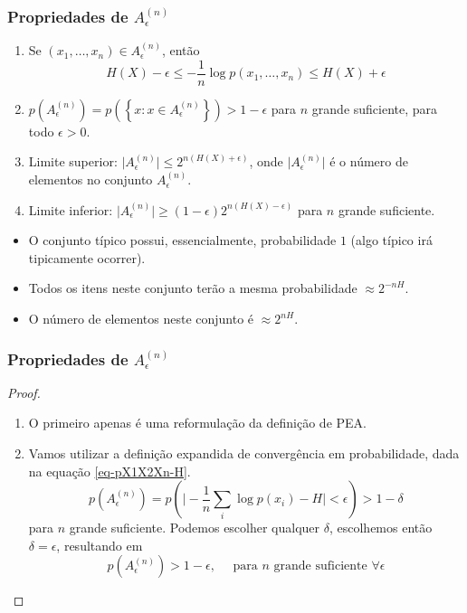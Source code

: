 \begin{frame}%
  \frametitle{Propriedades de $A_\epsilon^{(n)}$}
  \begin{theorem}
  \begin{enumerate}
  \item Se $(x_1, \ldots, x_n) \in A_\epsilon^{(n)}$, então
        \begin{equation}
        H(X) - \epsilon \leq - \frac{1}{n} \log p(x_1, \ldots, x_n) \leq H(X) + \epsilon
        \end{equation}
  \item $p(A_\epsilon^{(n)}) = p\left( \left\{ x: x \in A_\epsilon^{(n)} \right\} \right) > 1 - \epsilon$
        para $n$ grande suficiente, para todo $\epsilon > 0$.
  \item Limite superior: $\vert A_\epsilon^{(n)} \vert \leq 2^{n(H(X)+\epsilon)}$, onde
        $\vert A_\epsilon^{(n)} \vert$ é o número de elementos no conjunto $A_\epsilon^{(n)}$.
  \item Limite inferior: $\vert A_\epsilon^{(n)} \vert \geq (1-\epsilon) 2^{n(H(X)-\epsilon)}$ para
        $n$ grande suficiente.
  \end{enumerate}
  \end{theorem}
  
  \begin{itemize}
  \item O conjunto típico possui, essencialmente, probabilidade $1$ (algo típico irá tipicamente ocorrer).
  \item Todos os itens neste conjunto terão a mesma probabilidade $\approx 2^{-nH}$.
  \item O número de elementos neste conjunto é $\approx 2^{nH}$.
  \end{itemize}

\end{frame}


\begin{frame}%
  \frametitle{Propriedades de $A_\epsilon^{(n)}$}
  \begin{proof}
  \begin{enumerate}
        \item O primeiro apenas é uma reformulação da definição de PEA.
        \item Vamos utilizar a definição expandida de convergência em probabilidade,
                dada na equação \ref{eq-pX1X2Xn-H}.
                \begin{equation}
                p(A_\epsilon^{(n)}) = p\left( \vert - \frac{1}{n} \sum_i \log p(x_i) - H \vert < \epsilon \right) > 1 - \delta 
                \end{equation}
                para $n$ grande suficiente. 
                Podemos escolher qualquer $\delta$, escolhemos então $\delta = \epsilon$, resultando em
                \begin{equation}
                p(A_\epsilon^{(n)}) > 1 - \epsilon, \quad \text{ para } n \text{ grande suficiente } \forall \epsilon
                \end{equation}
  \end{enumerate}
  \end{proof}
\end{frame}


